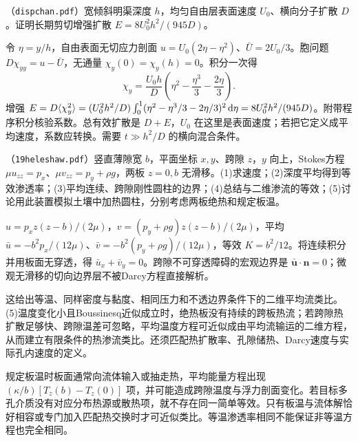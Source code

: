 \begin{exercise}
（\texttt{dispchan.pdf}）宽倾斜明渠深度 $h$，均匀自由层表面速度 $U_0$、横向分子扩散 $D$。证明长期剪切增强扩散 $E=8U_0^2h^2/(945D)$。
\end{exercise}
\begin{solution}
令 $\eta=y/h$，自由表面无切应力剖面 $u=U_0(2\eta-\eta^2)$、$\bar U=2U_0/3$。胞问题 $D\chi_{yy}=u-\bar U$，无通量 $\chi_y(0)=\chi_y(h)=0$。积分一次得
\[
\chi_y=\frac{U_0h}{D}\left(\eta^2-\frac{\eta^3}3-\frac{2\eta}3\right).
\]
增强 $E=D\langle \chi_y^2\rangle=(U_0^2h^2/D)\int_0^1(\eta^2-\eta^3/3-2\eta/3)^2\,\mathrm d\eta=8U_0^2h^2/(945D)$。附带程序积分核验系数。总有效扩散是 $D+E$，$U_0$ 在这里是表面速度；若把它定义成平均速度，系数应转换。需要 $t\gg h^2/D$ 的横向混合条件。
\end{solution}

\begin{exercise}
（\texttt{19heleshaw.pdf}）竖直薄隙宽 $b$，平面坐标 $x,y$、跨隙 $z$，$y$ 向上，Stokes方程 $\mu u_{zz}=p_x$、$\mu v_{zz}=p_y+\rho g$，两板 $z=0,b$ 无滑移。(1)求速度；(2)深度平均得到等效渗透率；(3)平均连续、跨隙刚性圆柱的边界；(4)总结与二维渗流的等效；(5)讨论用此装置模拟土壤中加热圆柱，分别考虑两板绝热和规定板温。
\end{exercise}
\begin{solution}
$u=p_xz(z-b)/(2\mu)$，$v=(p_y+\rho g)z(z-b)/(2\mu)$，平均 $\bar u=-b^2p_x/(12\mu)$、$\bar v=-b^2(p_y+\rho g)/(12\mu)$，等效 $K=b^2/12$。将连续积分并用板面无穿透，得 $\bar u_x+\bar v_y=0$。跨隙不可穿透障碍的宏观边界是 $\bar{\mathbf u}\cdot\mathbf n=0$；微观无滑移的切向边界层不被Darcy方程直接解析。

这给出等温、同样密度与黏度、相同压力和不透边界条件下的二维平均流类比。(5)温度变化小且Boussinesq近似成立时，绝热板没有持续的跨板热流；若跨隙热扩散足够快、跨隙温差可忽略，平均温度方程可近似成由平均流输运的二维方程，从而建立有限条件的热渗流类比。还须匹配热扩散率、孔隙储热、Darcy速度与实际孔内速度的定义。

规定板温时板面通常向流体输入或抽走热，平均能量方程出现 $(\kappa/b)[T_z(b)-T_z(0)]$ 项，并可能造成跨隙温度与浮力剖面变化。若目标多孔介质没有对应分布热源或散热项，就不存在同一简单等效。只有板温与流体解恰好相容或专门加入匹配热交换时才可近似类比。等温渗透率相同不能保证非等温方程也完全相同。
\end{solution}
